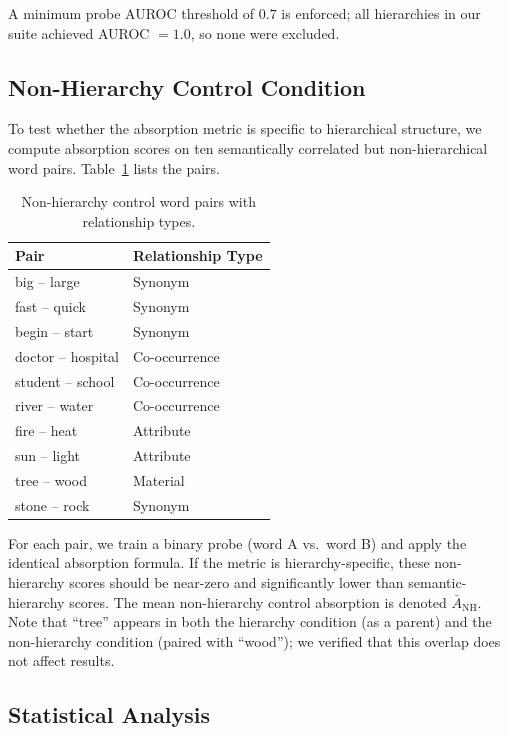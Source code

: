 \documentclass{article}
\begin{document}
A minimum probe AUROC threshold of $0.7$ is enforced; all hierarchies in our suite achieved AUROC $= 1.0$, so none were excluded.

\subsection{Non-Hierarchy Control Condition}

To test whether the absorption metric is specific to hierarchical structure, we compute absorption scores on ten semantically correlated but non-hierarchical word pairs. Table~\ref{tab:nonhierarchy} lists the pairs.

\begin{table}[t]
\caption{Non-hierarchy control word pairs with relationship types.}
\label{tab:nonhierarchy}
\centering
\begin{tabular}{ll}
\toprule
Pair & Relationship Type \\
\midrule
big -- large & Synonym \\
fast -- quick & Synonym \\
begin -- start & Synonym \\
doctor -- hospital & Co-occurrence \\
student -- school & Co-occurrence \\
river -- water & Co-occurrence \\
fire -- heat & Attribute \\
sun -- light & Attribute \\
tree -- wood & Material \\
stone -- rock & Synonym \\
\bottomrule
\end{tabular}
\end{table}

For each pair, we train a binary probe (word A vs.~word B) and apply the identical absorption formula. If the metric is hierarchy-specific, these non-hierarchy scores should be near-zero and significantly lower than semantic-hierarchy scores. The mean non-hierarchy control absorption is denoted $\bar{A}_{\text{NH}}$. Note that ``tree'' appears in both the hierarchy condition (as a parent) and the non-hierarchy condition (paired with ``wood''); we verified that this overlap does not affect results.

\subsection{Statistical Analysis}
\end{document}

